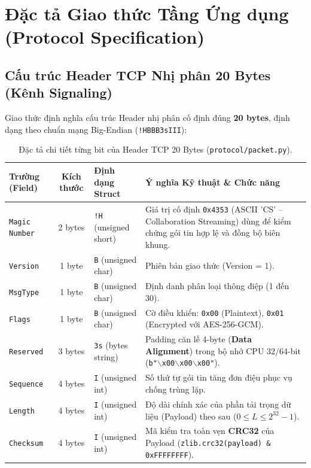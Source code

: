 \documentclass[11pt,a4paper]{article}
\begin{document}
\newpage

\section{Đặc tả Giao thức Tầng Ứng dụng (Protocol Specification)}

\subsection{Cấu trúc Header TCP Nhị phân 20 Bytes (Kênh Signaling)}
Giao thức định nghĩa cấu trúc Header nhị phân cố định đúng \textbf{20 bytes}, định dạng theo chuẩn mạng Big-Endian (\texttt{!HBBB3sIII}):

\begin{table}[htbp]
\centering
\small
\begin{tabularx}{\textwidth}{lcp{2.8cm}X}
\toprule
\rowcolor{headergray}
\textbf{Trường (Field)} & \textbf{Kích thước} & \textbf{Định dạng Struct} & \textbf{Ý nghĩa Kỹ thuật \& Chức năng} \\
\midrule
\texttt{Magic Number} & 2 bytes & \texttt{!H} (unsigned short) & Giá trị cố định \texttt{0x4353} (ASCII 'CS' -- Collaboration Streaming) dùng để kiểm chứng gói tin hợp lệ và đồng bộ biên khung. \\
\texttt{Version} & 1 byte & \texttt{B} (unsigned char) & Phiên bản giao thức (Version = 1). \\
\texttt{MsgType} & 1 byte & \texttt{B} (unsigned char) & Định danh phân loại thông điệp (1 đến 30). \\
\texttt{Flags} & 1 byte & \texttt{B} (unsigned char) & Cờ điều khiển: \texttt{0x00} (Plaintext), \texttt{0x01} (Encrypted với AES-256-GCM). \\
\texttt{Reserved} & 3 bytes & \texttt{3s} (bytes string) & Padding căn lề 4-byte (\textbf{Data Alignment}) trong bộ nhớ CPU 32/64-bit (\texttt{b"$\backslash$x00$\backslash$x00$\backslash$x00"}). \\
\texttt{Sequence} & 4 bytes & \texttt{I} (unsigned int) & Số thứ tự gói tin tăng đơn điệu phục vụ chống trùng lặp. \\
\texttt{Length} & 4 bytes & \texttt{I} (unsigned int) & Độ dài chính xác của phần tải trọng dữ liệu (Payload) theo sau ($0 \le L \le 2^{32}-1$). \\
\texttt{Checksum} & 4 bytes & \texttt{I} (unsigned int) & Mã kiểm tra toàn vẹn \textbf{CRC32} của Payload (\texttt{zlib.crc32(payload) \& 0xFFFFFFFF}). \\
\bottomrule
\end{tabularx}
\caption{Đặc tả chi tiết từng bit của Header TCP 20 Bytes (\texttt{protocol/packet.py}).}
\label{tab:tcp_header}
\end{table}
\end{document}

